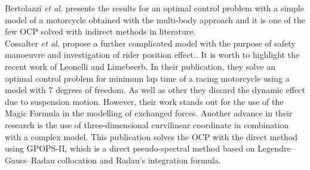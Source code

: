 Bertolazzi \textit{et al.}\cite{bertolazzi2005symbolic} presents the results for an optimal control problem with a simple model of a motorcycle obtained with the multi-body approach and it is one of the few OCP solved with indirect methods in literature.\cite{biral2016notes}\\
Cossalter \textit{et al.} propose a further complicated model with the purpose of safety manoeuvre and investigation of rider position effect.\cite{cossalter2013optimization,massaro2010virtual}.
It is worth to highlight the recent work of Leonelli and Limebeerb\cite{leonelli2019optimal}. In their publication, they solve an optimal control problem for minimum lap time of a racing motorcycle using a model with 7 degrees of freedom. As well as other they discard the dynamic effect due to suspension motion. However, their work stands out for the use of the Magic Formula \cite{pacejka2012tire} in the modelling of exchanged forces. Another advance in their research is the use of three-dimensional curvilinear coordinate in combination with a complex model. This publication solves the OCP with the direct method using GPOPS-II\cite{patterson2014gpops}, which is a direct pseudo-spectral method based on Legendre–Gauss–Radau collocation and Radau’s integration formula.
%